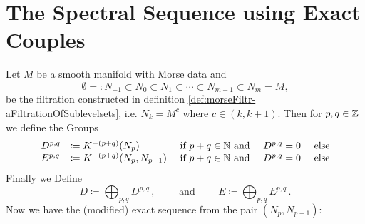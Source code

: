 \section{The Spectral Sequence using Exact Couples}

\begin{definition}\label{def: Exact Couple giving A Morse Sps} Let $M$ be a smooth manifold with Morse data and
	\begin{equation*}
		\emptyset=:N_{-1}\subset N_0\subset N_1\subset \cdots \subset N_{m-1}\subset N_m=M,
	\end{equation*} be the filtration constructed in definition \ref{def:morseFiltr-aFiltrationOfSublevelsets}, i.e. $N_k=M^c$ where $c\in (k,k+1)$. Then for $p,q\in \mathbb{Z}$ we define the Groups
	\begin{equation*}
		\begin{array}{lllll}
			D^{p,q} & \coloneq K^{-(p+q)}(N_p)&\text{ if }p+q\in \mathbb{N}
			~\text{and}~&D^{p,q}=0 & \text{ else}\\
			E^{p,q} & \coloneq K^{-(p+q)}(N_p,N_{p-1})&\text{ if }p+q\in \mathbb{N}
			~\text{and}~&D^{p,q}=0 & \text{ else}
		\end{array}
	\end{equation*}
	Finally we Define\begin{equation*}
		D \coloneq \bigoplus_{p,q}D^{p,q}\,,\qquad \text{ and }\qquad E\coloneq \bigoplus_{p,q}E^{p,q}\,.
	\end{equation*}
	Now we have the (modified) exact sequence from the pair $(N_p,N_{p-1})$:
	\begin{center}


\end{center}
\end{definition}
